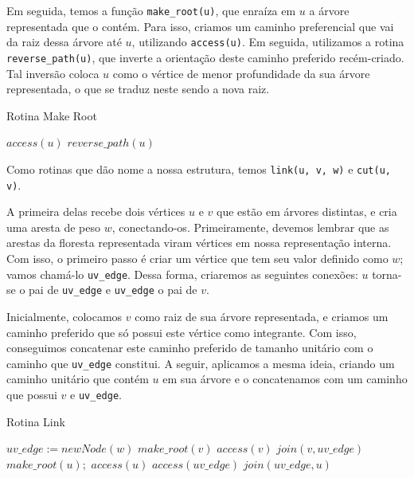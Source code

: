 Em seguida, temos a função \texttt{make\_root(u)}, que enraíza em $u$ a árvore representada que o contém. Para isso, criamos um caminho preferencial que vai da raiz dessa árvore até $u$, utilizando \texttt{access(u)}. Em seguida, utilizamos a rotina \texttt{reverse\_path(u)}, que inverte a orientação deste caminho preferido recém-criado. Tal inversão coloca $u$ como o vértice de menor profundidade da sua árvore representada, o que se traduz neste sendo a nova raiz.

\begin{algorithm}[h!]
    \caption{Rotina Make Root}\label{lct:make-root}
    \begin{algorithmic}
        \State $access(u)$
        \State $reverse\_path(u)$
        \EndFunction
    \end{algorithmic}
\end{algorithm}

Como rotinas que dão nome a nossa estrutura, temos \texttt{link(u, v, w)} e \texttt{cut(u, v)}.

A primeira delas recebe dois vértices $u$ e $v$ que estão em árvores distintas, e cria uma aresta de peso $w$, conectando-os. Primeiramente, devemos lembrar que as arestas da floresta representada viram vértices em nossa representação interna. Com isso, o primeiro passo é criar um vértice que tem seu valor definido como $w$; vamos chamá-lo \texttt{uv\_edge}. Dessa forma, criaremos as seguintes conexões: $u$ torna-se o pai de \texttt{uv\_edge} e \texttt{uv\_edge} o pai de $v$.

Inicialmente, colocamos $v$ como raiz de sua árvore representada, e criamos um caminho preferido que só possui este vértice como integrante. Com isso, conseguimos concatenar este caminho preferido de tamanho unitário com o caminho que \texttt{uv\_edge} constitui. A seguir, aplicamos a mesma ideia, criando um caminho unitário que contém $u$ em sua árvore e o concatenamos com um caminho que possui $v$ e \texttt{uv\_edge}.

\begin{algorithm}[h!]
    \caption{Rotina Link}\label{lct:link}
    \begin{algorithmic}
        \State $uv\_edge := new Node(w)$ 
        \State {}
        \State $make\_root(v)$
        \State $access(v)$
        \State $join(v, uv\_edge)$
        \State {}
        \State $make\_root(u);$
        \State $access(u)$
        \State $access(uv\_edge)$
        \State $join(uv\_edge, u)$
        \EndFunction
    \end{algorithmic}
\end{algorithm}

